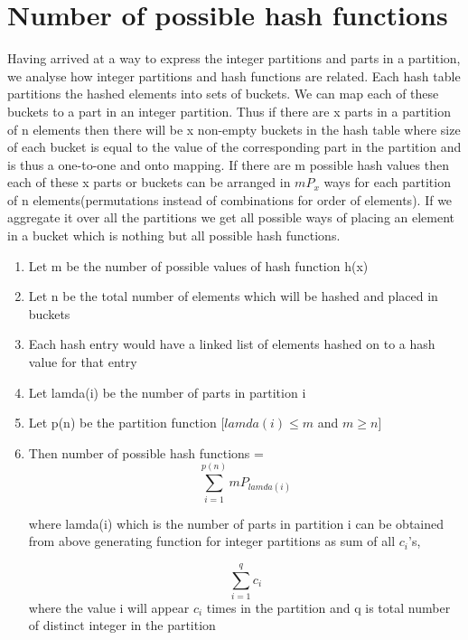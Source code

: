 \documentclass[11pt,onecolumn]{article}
\begin{document}
\section {Number of possible hash functions}
Having arrived at a way to express the integer partitions and parts in a partition, we analyse how integer partitions and hash functions are related. Each hash table partitions the hashed elements into sets of buckets. We can map each of these buckets to a part in an integer partition. Thus if there are x parts in a partition of n elements then there will be x non-empty buckets in the hash table where size of each bucket is equal to the value of the corresponding part in the partition and is thus a one-to-one and onto mapping. If there are m possible hash values then each of these x parts or buckets can be arranged in $mP_{x}$ ways for each partition of n elements(permutations instead of combinations for order of elements). If we aggregate it over all the partitions we get all possible ways of placing an element in a bucket which is nothing but all possible hash functions.

\begin{enumerate}
\item Let m be the number of possible values of hash function h(x)
\item Let n be the total number of elements which will be hashed and placed in buckets
\item Each hash entry would have a linked list of elements hashed on to a hash value for that entry
\item Let lamda(i) be the number of parts in partition i
\item Let p(n) be the partition function
[$lamda(i) \leq m$ and $m \geq n$]

\item Then number of possible hash functions = 
\begin{equation}
\sum_{i=1}^{p(n)} mP_{lamda(i)}
\end{equation}

where lamda(i) which is the number of parts in partition i can be obtained from above generating function for integer partitions as sum of all $c_{i}$'s,

\begin{equation}
\sum_{i=1}^{q} c_{i}
\end{equation}
where the value i will appear $c_{i}$ times in the partition and q is total number of distinct integer in the partition
\end{enumerate}
\end{document}
